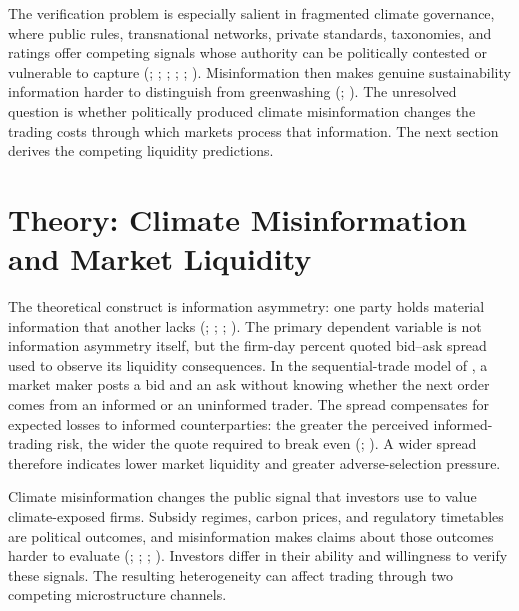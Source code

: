 \documentclass{article}
\theoremstyle{plain}
\begin{document}
The verification problem is especially salient in fragmented climate governance, where public rules, transnational networks, private standards, taxonomies, and ratings offer competing signals whose authority can be politically contested or vulnerable to capture (\cite{KeohaneVictor2011}; \cite{HaleHeld2018}; \cite{Bodansky2016}; \cite{Rajamani2017}; \cite{AbbottSnidal2000}; \cite{ButheMattli2011}). Misinformation then makes genuine sustainability information harder to distinguish from greenwashing (\cite{delmas2011drivers}; \cite{marquis2016scrutiny}). The unresolved question is whether politically produced climate misinformation changes the trading costs through which markets process that information. The next section derives the competing liquidity predictions.

\section{Theory: Climate Misinformation and Market Liquidity}
\label{sec:theory}

The theoretical construct is information asymmetry: one party holds material information that another lacks (\cite{Akerlof1970}; \cite{Stiglitz2000}; \cite{StiglitzKosenko2024a}; \cite{StiglitzKosenko2024b}). The primary dependent variable is not information asymmetry itself, but the firm-day percent quoted bid--ask spread used to observe its liquidity consequences. In the sequential-trade model of \textcite{GlostenMilgrom1985}, a market maker posts a bid and an ask without knowing whether the next order comes from an informed or an uninformed trader. The spread compensates for expected losses to informed counterparties: the greater the perceived informed-trading risk, the wider the quote required to break even (\cite{EasleyOHara1992}; \cite{Hasbrouck1991}). A wider spread therefore indicates lower market liquidity and greater adverse-selection pressure.

Climate misinformation changes the public signal that investors use to value climate-exposed firms. Subsidy regimes, carbon prices, and regulatory timetables are political outcomes, and misinformation makes claims about those outcomes harder to evaluate (\cite{PastorVeronesi2012}; \cite{PastorVeronesi2013}; \cite{delmas2011drivers}; \cite{marquis2016scrutiny}). Investors differ in their ability and willingness to verify these signals. The resulting heterogeneity can affect trading through two competing microstructure channels.
\end{document}
